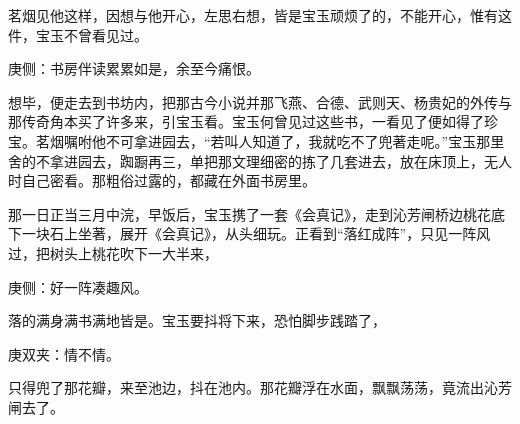 \begin{parag}
    茗烟见他这样，因想与他开心，左思右想，皆是宝玉顽烦了的，不能开心，惟有这件，宝玉不曾看见过。\begin{note}庚侧：书房伴读累累如是，余至今痛恨。\end{note}想毕，便走去到书坊内，把那古今小说并那飞燕、合德、武则天、杨贵妃的外传与那传奇角本买了许多来，引宝玉看。宝玉何曾见过这些书，一看见了便如得了珍宝。茗烟嘱咐他不可拿进园去，“若叫人知道了，我就吃不了兜著走呢。”宝玉那里舍的不拿进园去，踟蹰再三，单把那文理细密的拣了几套进去，放在床顶上，无人时自己密看。那粗俗过露的，都藏在外面书房里。
\end{parag}


\begin{parag}
    那一日正当三月中浣，早饭后，宝玉携了一套《会真记》，走到沁芳闸桥边桃花底下一块石上坐著，展开《会真记》，从头细玩。正看到“落红成阵”，只见一阵风过，把树头上桃花吹下一大半来，\begin{note}庚侧：好一阵凑趣风。\end{note}落的满身满书满地皆是。宝玉要抖将下来，恐怕脚步践踏了，\begin{note}庚双夹：情不情。\end{note}只得兜了那花瓣，来至池边，抖在池内。那花瓣浮在水面，飘飘荡荡，竟流出沁芳闸去了。
\end{parag}



